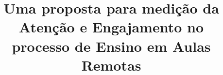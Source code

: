 \title{Uma proposta para medição da Atenção e Engajamento no processo de Ensino em Aulas Remotas}


% 